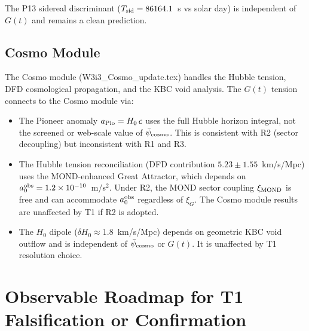 \documentclass[aps,prd,twocolumn,superscriptaddress,nofootinbib,longbibliography]{revtex4-2}
\newcommand{\psibar}{\bar{\psi}}
\newcommand{\ee}[1]{\times 10^{#1}}
\begin{document}
The P13 sidereal discriminant ($T_{\rm sid} = 86164.1$~s vs solar day) is
independent of $G(t)$ and remains a clean prediction.

\subsection{Cosmo Module}
\label{sec:cosmo-crossref}

The Cosmo module (W3i3\_Cosmo\_update.tex) handles the Hubble tension,
DFD cosmological propagation, and the KBC void analysis.  The $G(t)$
tension connects to the Cosmo module via:
\begin{itemize}
\item The Pioneer anomaly $a_{\rm Pio} = H_0\,c$ uses the full Hubble
  horizon integral, not the screened or web-scale value of $\psibar_{\rm cosmo}$.
  This is consistent with R2 (sector decoupling) but inconsistent with
  R1 and R3.
\item The Hubble tension reconciliation (DFD contribution $5.23\pm1.55$~km/s/Mpc)
  uses the MOND-enhanced Great Attractor, which depends on $a_0^{\rm obs}
  = 1.2\ee{-10}$~m/s$^2$.  Under R2, the MOND sector coupling $\xi_{\rm MOND}$
  is free and can accommodate $a_0^{\rm obs}$ regardless of $\xi_G$.  The
  Cosmo module results are unaffected by T1 if R2 is adopted.
\item The $H_0$ dipole ($\delta H_0 \approx 1.8$~km/s/Mpc) depends on
  geometric KBC void outflow and is independent of $\psibar_{\rm cosmo}$
  or $G(t)$.  It is unaffected by T1 resolution choice.
\end{itemize}

\section{Observable Roadmap for T1 Falsification or Confirmation}
\label{sec:roadmap}
\end{document}

